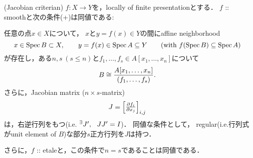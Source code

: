 \documentclass[a4paper, dvipdfmx]{jsarticle}
\begin{document}
\begin{Prop}(Jacobian criterian) \label{prop:jac_cri}
    $f \colon X \to Y$を，locally of finite presentationとする．
    $f$ :: smoothと次の条件(+)は同値である:
    
    任意の点$x \in X$について，
    $x$と$y=f(x) \in Y$の間にaffine neighborhood
    \[
        x \in \operatorname{Spec} B \subset X, \qquad y=f(x) \in \operatorname{Spec} A \subseteq Y
        \qquad (\text{with  }f(\operatorname{Spec} B) \subseteq \operatorname{Spec} A)
    \]
    が存在し，ある$n, s\ (s \leq n)$と$f_1, \dots, f_s \in A[x_1, \dots, x_n]$について
    \[ B \cong \frac{A[x_1, \dots, x_n]}{(f_1, \dots, f_s)}. \]
    さらに，Jacobian matrix ($n \times s$-matrix)
    \[ J=\begin{bmatrix} \frac{\partial f_i}{\partial x_j} \end{bmatrix}_{i, j} \]
    は，右逆行列をもつ(i.e. ${}^{\exists} J',~~ JJ'=I$)．
    同値な条件として，
    regular(i.e.行列式がunit element of $B$)な部分$s$正方行列を$J$は持つ．

    さらに，$f$ :: etaleと，この条件で$n=s$であることは同値である．
\end{Prop}
\end{document}
